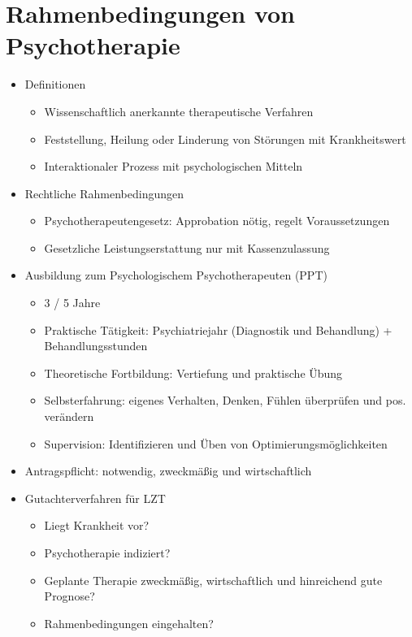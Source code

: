 \documentclass[11pt, paper=a4, twocolumn]{scrartcl}
\begin{document}
	\section{Rahmenbedingungen von Psychotherapie}
		\begin{itemize}
			\item Definitionen
				\begin{itemize}
					\item Wissenschaftlich anerkannte therapeutische Verfahren
					\item Feststellung, Heilung oder Linderung von Störungen mit Krankheitswert
					\item Interaktionaler Prozess mit psychologischen Mitteln
				\end{itemize}
			\item Rechtliche Rahmenbedingungen
				\begin{itemize}
					\item Psychotherapeutengesetz: Approbation nötig, regelt Voraussetzungen
					\item Gesetzliche Leistungserstattung nur mit Kassenzulassung
				\end{itemize}
			\item Ausbildung zum Psychologischem Psychotherapeuten (PPT)
				\begin{itemize}
					\item 3 / 5 Jahre
					\item Praktische Tätigkeit: Psychiatriejahr (Diagnostik und Behandlung) + Behandlungsstunden
					\item Theoretische Fortbildung: Vertiefung und praktische Übung
					\item Selbsterfahrung: eigenes Verhalten, Denken, Fühlen überprüfen und pos. verändern
					\item Supervision: Identifizieren und Üben von Optimierungsmöglichkeiten
				\end{itemize}
			\item Antragspflicht: notwendig, zweckmäßig und wirtschaftlich
			\item Gutachterverfahren für LZT
				\begin{itemize}
					\item Liegt Krankheit vor?
					\item Psychotherapie indiziert?
					\item Geplante Therapie zweckmäßig, wirtschaftlich und hinreichend gute Prognose?
					\item Rahmenbedingungen eingehalten?
				\end{itemize}

\end{itemize}
\end{document}
